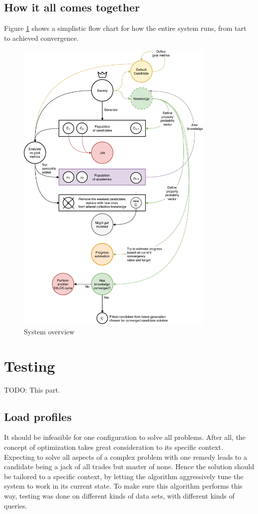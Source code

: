 \documentclass[a4paper,english]{report}
\begin{document}
		\subsection{How it all comes together}
		Figure \ref{fig:sys_overview} shows a simplistic flow chart for how the entire system runs, from tart to achieved convergence.
		\begin{figure}[ht]
			\centering
			\includegraphics[width=270pt]{overview}
			\caption{System overview}
			\label{fig:sys_overview}
		\end{figure}
		\clearpage
		\section{Testing}
		TODO: This part.
		\label{testing}
			\subsection{Load profiles}
				It should be infeasible for one configuration to solve all problems. After all, the concept of optimization takes great consideration to its specific context. Expecting to solve all aspects of a complex problem with one remedy leads to a candidate being a jack of all trades but master of none. Hence the solution should be tailored to a specific context, by letting the algorithm aggressively tune the system to work in its current state. To make sure this algorithm performs this way, testing was done on different kinds of data sets, with different kinds of queries.
\end{document}
